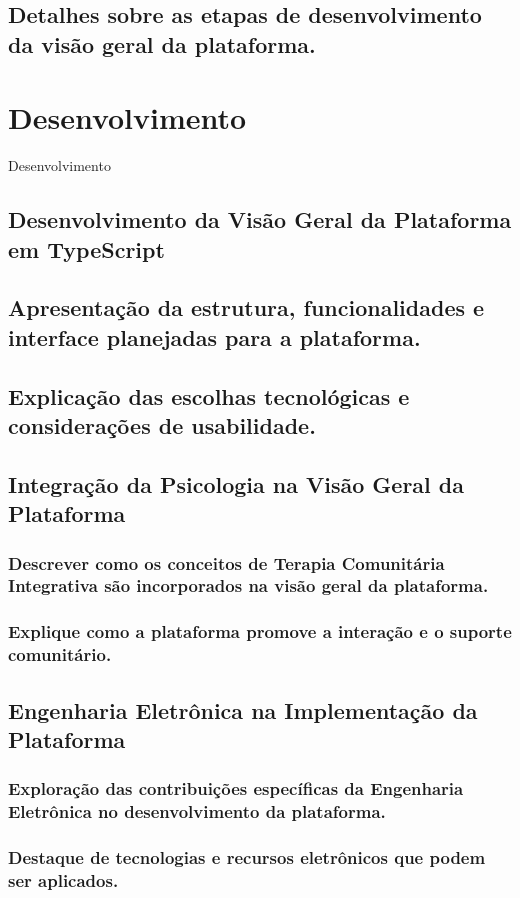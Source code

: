 \section{Detalhes sobre as etapas de desenvolvimento da visão geral da plataforma.}
\chapter{Desenvolvimento}{Desenvolvimento}
\section{Desenvolvimento da Visão Geral da Plataforma em TypeScript}
\section{Apresentação da estrutura, funcionalidades e interface planejadas para a plataforma.}
\section{Explicação das escolhas tecnológicas e considerações de usabilidade.}
\section{Integração da Psicologia na Visão Geral da Plataforma}
\subsection{Descrever como os conceitos de Terapia Comunitária Integrativa são incorporados na visão geral da plataforma.}
\subsection{Explique como a plataforma promove a interação e o suporte comunitário.}
\section{Engenharia Eletrônica na Implementação da Plataforma}
\subsection{Exploração das contribuições específicas da Engenharia Eletrônica no desenvolvimento da plataforma.}
\subsection{Destaque de tecnologias e recursos eletrônicos que podem ser aplicados.}

